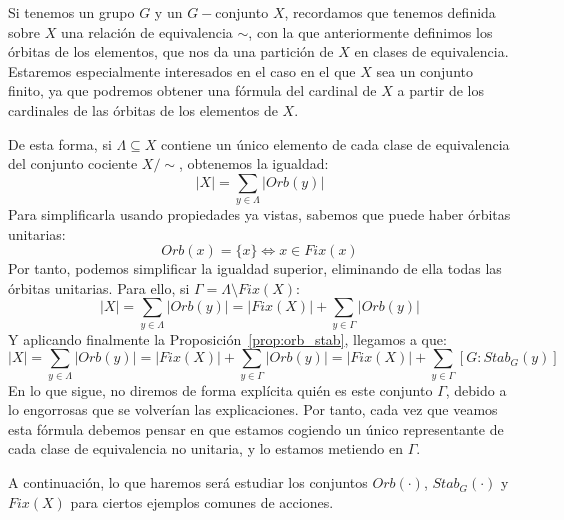 \begin{observacion}
    Si tenemos un grupo $G$ y un $G-$conjunto $X$, recordamos que tenemos definida sobre $X$ una relación de equivalencia $\sim$, con la que anteriormente definimos los órbitas de los elementos, que nos da una partición de $X$ en clases de equivalencia. Estaremos especialmente interesados en el caso en el que $X$ sea un conjunto finito, ya que podremos obtener una fórmula del cardinal de $X$ a partir de los cardinales de las órbitas de los elementos de $X$.

    De esta forma, si $\Lambda\subseteq X$ contiene un único elemento de cada clase de equivalencia del conjunto cociente $X/\sim$, obtenemos la igualdad:
    \begin{equation*}
        |X| = \sum_{y\in \Lambda}|Orb(y)|
    \end{equation*}
    Para simplificarla usando propiedades ya vistas, sabemos que puede haber órbitas unitarias:
    \begin{equation*}
        Orb(x) = \{x\} \Longleftrightarrow x\in Fix(x)
    \end{equation*}
    Por tanto, podemos simplificar la igualdad superior, eliminando de ella todas las órbitas unitarias. Para ello, si $\Gamma = \Lambda\setminus Fix(X)$:
    \begin{equation*}
        |X| = \sum_{y\in \Lambda}|Orb(y)| = |Fix(X)| + \sum_{y\in \Gamma}|Orb(y)|
    \end{equation*}
    Y aplicando finalmente la Proposición~\ref{prop:orb_stab}, llegamos a que:
    \begin{equation*}
        |X| = \sum_{y\in \Lambda}|Orb(y)| = |Fix(X)| + \sum_{y\in \Gamma}|Orb(y)| = |Fix(X)| + \sum_{y\in \Gamma} [G:Stab_G(y)]
    \end{equation*}
    En lo que sigue, no diremos de forma explícita quién es este conjunto $\Gamma$, debido a lo engorrosas que se volverían las explicaciones. Por tanto, cada vez que veamos esta fórmula debemos pensar en que estamos cogiendo un único representante de cada clase de equivalencia no unitaria, y lo estamos metiendo en $\Gamma$.
\end{observacion}

\noindent
A continuación, lo que haremos será estudiar los conjuntos $Orb(\cdot )$, $Stab_G(\cdot )$ y $Fix(X)$ para ciertos ejemplos comunes de acciones.
